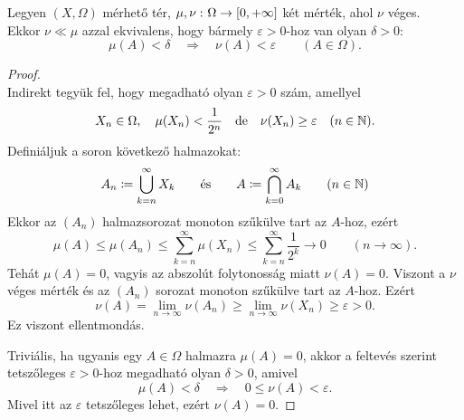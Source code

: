 \documentclass[
]{elteikthesis}[2024/04/26]
\begin{document}
	\begin{lemma}{}{}
		Legyen \( (X, \Omega) \) mérhető tér, 
		\( \mu, \nu \,\colon \Omega \to [0, +\infty] \) két mérték, ahol \( \nu \) véges.\\[6pt]
		Ekkor \( \nu \ll \mu \) azzal ekvivalens, hogy
		bármely \( \varepsilon > 0 \)-hoz van olyan \( \delta > 0 \):
		\[
			\mu(A) < \delta
			\quad \Longrightarrow \quad
			\nu(A) < \varepsilon
			\qquad (A \in \Omega).
		\]
	\end{lemma}
	\begin{proof}\,\\
		\Ifstep
		Indirekt tegyük fel, hogy megadható olyan \( \varepsilon > 0 \) szám, amellyel
		\[
			X_n \in \Omega, \quad 
			\mu(X_n) < \frac{1}{2^n} 
			\quad \text{de} \quad
			\nu( X_n ) \geq \varepsilon \quad (n \in \mathbb{N}).
		\]
		Definiáljuk a soron következő halmazokat:
		\[
			A_n \coloneq \bigcup_{k=n}^{\infty} X_k 
			\qquad \text{és} \qquad
			A \coloneq \bigcap_{k=0}^{\infty} A_k
			\qquad (n \in \mathbb{N})
		\]
		Ekkor az \( (A_n) \) halmazsorozat monoton szűkülve tart az \( A \)-hoz, ezért
		\[
			\mu( A ) \leq 
			\mu( A_n ) \leq 
			\sum_{k=n}^{\infty} \mu( X_n ) \leq
			\sum_{k=n}^{\infty} \frac{1}{2^k}
			\longrightarrow 0
			\qquad (n \to \infty).
		\]
		Tehát \( \mu(A) = 0 \), vagyis az abszolút folytonosság miatt \( \nu(A) = 0 \).
		Viszont a \( \nu \) véges mérték és az \( (A_n) \) sorozat monoton szűkülve tart az \( A \)-hoz. Ezért
		\[
			\nu(A) = 
			\lim_{n \to \infty} \nu(A_n) \geq 
			\lim_{n \to \infty} \nu(X_n) \geq 
			\varepsilon > 0.
		\]
		Ez viszont ellentmondás.
		
		\Backifstep Triviális, ha ugyanis egy \( A \in \Omega \) halmazra \( \mu(A) = 0 \), 
		akkor a feltevés szerint tetszőleges \( \varepsilon > 0 \)-hoz megadható olyan \( \delta > 0 \), amivel
		\[
			\mu(A) < \delta
			\quad \Longrightarrow \quad
			0 \leq \nu(A) < \varepsilon.
		\]
		Mivel itt az \( \varepsilon \) tetszőleges lehet, ezért \( \nu(A) = 0 \).
	\end{proof}
	
\end{document}
